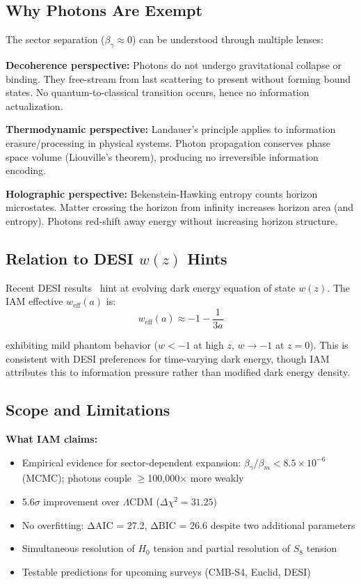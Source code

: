 \documentclass[twocolumn,superscriptaddress,prl,amsmath,amssymb]{revtex4-2}
\begin{document}
\subsection{Why Photons Are Exempt}

The sector separation ($\beta_\gamma \approx 0$) can be understood through multiple lenses:

\textbf{Decoherence perspective:} Photons do not undergo gravitational collapse or binding. They free-stream from last scattering to present without forming bound states. No quantum-to-classical transition occurs, hence no information actualization.

\textbf{Thermodynamic perspective:} Landauer's principle applies to information erasure/processing in physical systems. Photon propagation conserves phase space volume (Liouville's theorem), producing no irreversible information encoding.

\textbf{Holographic perspective:} Bekenstein-Hawking entropy counts horizon microstates. Matter crossing the horizon from infinity increases horizon area (and entropy). Photons red-shift away energy without increasing horizon structure.

\subsection{Relation to DESI $w(z)$ Hints}

Recent DESI results~\cite{DESI2024} hint at evolving dark energy equation of state $w(z)$. The IAM effective $w_{\text{eff}}(a)$ is:
\begin{equation}
w_{\text{eff}}(a) \approx -1 - \frac{1}{3a}
\end{equation}

exhibiting mild phantom behavior ($w < -1$ at high $z$, $w \to -1$ at $z=0$). This is consistent with DESI preferences for time-varying dark energy, though IAM attributes this to information pressure rather than modified dark energy density.

\subsection{Scope and Limitations}

\textbf{What IAM claims:}
\begin{itemize}
\item Empirical evidence for sector-dependent expansion: $\beta_\gamma/\beta_m < 8.5 \times 10^{-6}$ (MCMC); photons couple $\geq$100,000$\times$ more weakly
\item 5.6$\sigma$ improvement over $\Lambda$CDM ($\Delta\chi^2 = 31.25$)
\item No overfitting: ΔAIC = 27.2, ΔBIC = 26.6 despite two additional parameters
\item Simultaneous resolution of $H_0$ tension and partial resolution of $S_8$ tension
\item Testable predictions for upcoming surveys (CMB-S4, Euclid, DESI)
\end{itemize}
\end{document}
